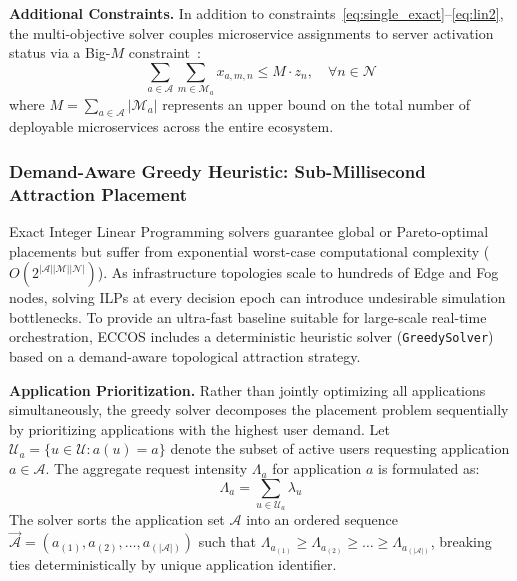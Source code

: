 \documentclass[ASNA]{USG} %
\begin{document}
\textbf{Additional Constraints.} In addition to constraints~\eqref{eq:single_exact}--\eqref{eq:lin2}, the multi-objective solver couples microservice assignments to server activation status via a Big-$M$ constraint~\cite{9060940}:
\begin{equation}
\sum_{a \in \mathcal{A}} \sum_{m \in \mathcal{M}_a} x_{a,m,n} \leq M \cdot z_n, \quad \forall n \in \mathcal{N}
\end{equation}
where $M = \sum_{a \in \mathcal{A}} |\mathcal{M}_a|$ represents an upper bound on the total number of deployable microservices across the entire ecosystem.

\subsubsection{Demand-Aware Greedy Heuristic: Sub-Millisecond Attraction Placement}
\label{subsec:greedy_solver}

Exact Integer Linear Programming solvers guarantee global or Pareto-optimal placements but suffer from exponential worst-case computational complexity ($O(2^{|\mathcal{A}||\mathcal{M}||\mathcal{N}|})$). As infrastructure topologies scale to hundreds of Edge and Fog nodes, solving ILPs at every decision epoch can introduce undesirable simulation bottlenecks. To provide an ultra-fast baseline suitable for large-scale real-time orchestration, \textsc{ECCOS} includes a deterministic heuristic solver (\texttt{GreedySolver}) based on a demand-aware topological attraction strategy.

\textbf{Application Prioritization.} Rather than jointly optimizing all applications simultaneously, the greedy solver decomposes the placement problem sequentially by prioritizing applications with the highest user demand. Let $\mathcal{U}_a = \{u \in \mathcal{U} : a(u) = a\}$ denote the subset of active users requesting application $a \in \mathcal{A}$. The aggregate request intensity $\Lambda_a$ for application $a$ is formulated as:
\begin{equation}
\Lambda_a = \sum_{u \in \mathcal{U}_a} \lambda_u
\end{equation}
The solver sorts the application set $\mathcal{A}$ into an ordered sequence $\vec{\mathcal{A}} = (a_{(1)}, a_{(2)}, \dots, a_{(|\mathcal{A}|)})$ such that $\Lambda_{a_{(1)}} \geq \Lambda_{a_{(2)}} \geq \dots \geq \Lambda_{a_{(|\mathcal{A}|)}}$, breaking ties deterministically by unique application identifier.
\end{document}

